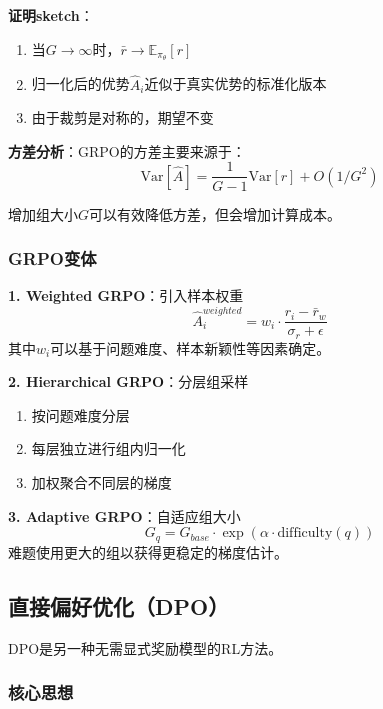 \documentclass[12pt,a4paper]{article}
\begin{document}
\textbf{证明sketch}：
\begin{enumerate}
    \item 当$G \rightarrow \infty$时，$\bar{r} \rightarrow \mathbb{E}_{\pi_\theta}[r]$
    \item 归一化后的优势$\hat{A}_i$近似于真实优势的标准化版本
    \item 由于裁剪是对称的，期望不变
\end{enumerate}

\textbf{方差分析}：GRPO的方差主要来源于：
\begin{equation}
\text{Var}[\hat{A}] = \frac{1}{G-1}\text{Var}[r] + O(1/G^2)
\end{equation}

增加组大小$G$可以有效降低方差，但会增加计算成本。

\subsubsection{GRPO变体}

\textbf{1. Weighted GRPO}：引入样本权重
\begin{equation}
\hat{A}_i^{weighted} = w_i \cdot \frac{r_i - \bar{r}_w}{\sigma_r + \epsilon}
\end{equation}
其中$w_i$可以基于问题难度、样本新颖性等因素确定。

\textbf{2. Hierarchical GRPO}：分层组采样
\begin{enumerate}
    \item 按问题难度分层
    \item 每层独立进行组内归一化
    \item 加权聚合不同层的梯度
\end{enumerate}

\textbf{3. Adaptive GRPO}：自适应组大小
\begin{equation}
G_q = G_{base} \cdot \exp\left(\alpha \cdot \text{difficulty}(q)\right)
\end{equation}
难题使用更大的组以获得更稳定的梯度估计。

\subsection{直接偏好优化（DPO）}

DPO是另一种无需显式奖励模型的RL方法。

\subsubsection{核心思想}
\end{document}
